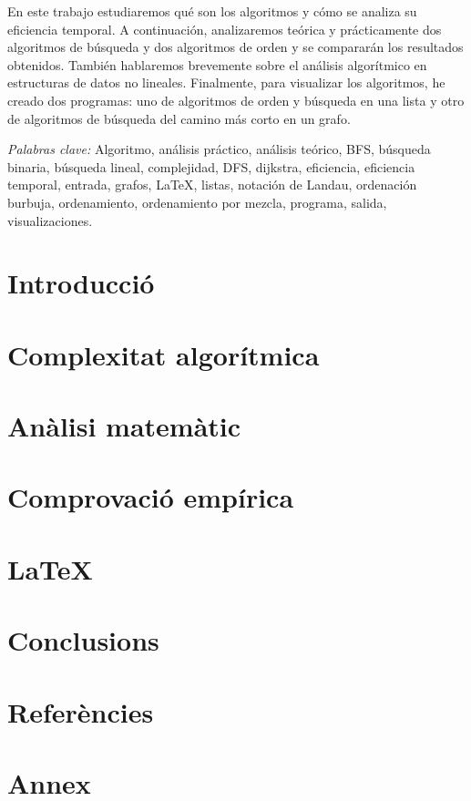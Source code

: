 \documentclass[12pt, a4paper, oneside]{report}
\begin{document}
En este trabajo estudiaremos qué son los algoritmos y cómo se analiza su eficiencia temporal. A continuación, analizaremos teórica y prácticamente dos algoritmos de búsqueda y dos algoritmos de orden y se compararán los resultados obtenidos. También hablaremos brevemente sobre el análisis algorítmico en estructuras de datos no lineales. Finalmente, para visualizar los algoritmos, he creado dos programas: uno de algoritmos de orden y búsqueda en una lista y otro de algoritmos de búsqueda del camino más corto en un grafo.

\textit{Palabras clave: } Algoritmo, análisis práctico, análisis teórico, BFS, búsqueda binaria, búsqueda lineal, complejidad, DFS, dijkstra, eficiencia, eficiencia temporal, entrada, grafos, LaTeX, listas, notación de Landau, ordenación burbuja, ordenamiento, ordenamiento por mezcla, programa, salida, visualizaciones.

\chapter*{Introducció}


\setcounter{chapter}{0}
\chapter{Complexitat algorítmica} 



\chapter{Anàlisi matemàtic}


\chapter{Comprovació empírica}


\chapter{\LaTeX}


\chapter{Conclusions}


\chapter{Referències}


\chapter{Annex}

\end{document}
